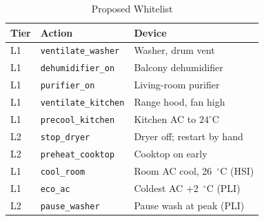 \documentclass[conference]{IEEEtran}
\begin{document}
\begin{table}[!t]
\caption{Proposed Whitelist}
\label{tab:whitelist}
\begin{center}
\begin{tabular}{lll}
\toprule
\textbf{Tier} & \textbf{Action} & \textbf{Device} \\
\midrule
L1 & \texttt{ventilate\_washer} & Washer, drum vent \\
L1 & \texttt{dehumidifier\_on} & Balcony dehumidifier \\
L1 & \texttt{purifier\_on} & Living-room purifier \\
L1 & \texttt{ventilate\_kitchen} & Range hood, fan high \\
L1 & \texttt{precool\_kitchen} & Kitchen AC to $24^\circ\text{C}$ \\
L2 & \texttt{stop\_dryer} & Dryer off; restart by hand \\
L2 & \texttt{preheat\_cooktop} & Cooktop on early \\
L1 & \texttt{cool\_room} & Room AC cool, 26~$^\circ$C (HSI) \\
L1 & \texttt{eco\_ac} & Coldest AC +2~$^\circ$C (PLI) \\
L2 & \texttt{pause\_washer} & Pause wash at peak (PLI) \\
\bottomrule
\end{tabular}
\end{center}
\end{table}
\end{document}
